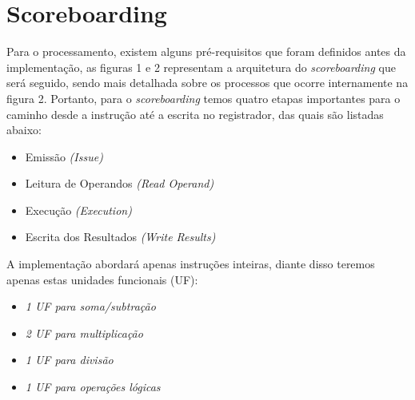 \documentclass[journal]{IEEEtran}
\begin{document}

\section{Scoreboarding}
Para o processamento, existem alguns pré-requisitos que foram definidos antes da implementação, as figuras 1 e 2 representam a arquitetura do \textit{scoreboarding} que será seguido, sendo mais detalhada sobre os processos que ocorre internamente na figura 2. Portanto, para o \textit{scoreboarding} temos quatro etapas importantes para o caminho desde a instrução até a escrita no registrador, das quais são listadas abaixo: 
\begin{itemize}
    \item Emissão \textit{(Issue)}
    \item Leitura de Operandos \textit{(Read Operand)}
    \item Execução \textit{(Execution)}
    \item Escrita dos Resultados \textit{(Write Results)}
\end{itemize}
A implementação abordará apenas instruções inteiras, diante disso teremos apenas estas unidades funcionais (UF): 
\begin{itemize}
    \item \textit{1 UF para soma/subtração}
    \item \textit{2 UF para multiplicação}
    \item \textit{1 UF para divisão}
    \item \textit{1 UF para operações lógicas}
\end{itemize}
\end{document}
